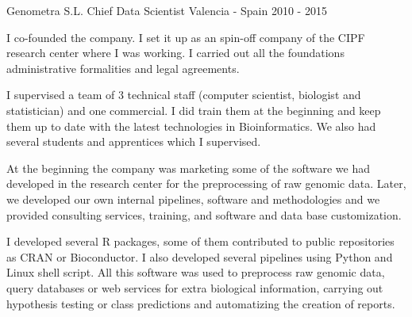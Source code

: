 \begin{cventries}
\cventry
{Genometra S.L.} %
{Chief Data Scientist} %
{Valencia - Spain} %
{2010 - 2015} %
{ %
\begin{cvitems}
\item {
I co-founded the company.
I set it up as an spin-off company of the CIPF research center where I was working.
I carried out all the foundations administrative formalities and legal agreements.
}
\item {
I supervised a team of 3 technical staff (computer scientist, biologist and statistician)
and one commercial. 
I did train them at the beginning and keep them up to date with the latest technologies in Bioinformatics.
We also had several students and apprentices which I supervised.
}
\item {
At the beginning the company was marketing some of the software we had developed
in the research center for the preprocessing of raw genomic data. 
Later, we developed our own internal pipelines, software and methodologies
and we provided consulting services, training, and software and data base customization.
}
\item{
I developed several R packages, some of them contributed to public repositories as CRAN or Bioconductor.
I also developed several pipelines using Python and Linux shell script.
All this software was used to preprocess raw genomic data,
query databases or web services for extra biological information,
carrying out hypothesis testing or class predictions
and automatizing the creation of reports.
}
\end{cvitems} 
}



\end{cventries}
